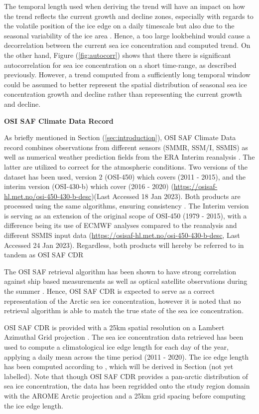 \documentclass[../main/thesis.tex]{subfiles}
\begin{document}
The temporal length used when deriving the trend will have an impact on how the trend reflects the current growth and decline zones, especially with regards to the volatile position of the ice edge on a daily timescale but also due to the seasonal variability of the ice area \citep{Holland2016}. Hence, a too large lookbehind would cause a decorrelation between the current sea ice concentration and computed trend. On the other hand, Figure (\ref{fig:autocorr}) shows that there there is significant autocorrelation for sea ice concentration on a short time-range, as described previously. However, a trend computed from a sufficiently long temporal window could be assumed to better represent the spatial distribution of seasonal sea ice concentration growth and decline rather than representing the current growth and decline.

\textbf{OSI SAF Climate Data Record}

As briefly mentioned in Section (\ref{sec:introduction}), OSI SAF Climate Data record combines observations from different sensors (SMMR, SSM/I, SSMIS) as well as numerical weather prediction fields from the ERA Interim reanalysis \citep{Dee2011}. The latter are utilized to correct for the atmospheric conditions. Two versions of the dataset has been used, version 2 (OSI-450) which covers (2011 - 2015), and the interim version (OSI-430-b) which cover (2016 - 2020) (\url{https://osisaf-hl.met.no/osi-450-430-b-desc})(Last Accessed 18 Jan 2023). Both products are processed using the same algorithms, ensuring consistency \citep{Lavergne2019a}. The Interim version is serving as an extension of the original scope of OSI-450 (1979 - 2015), with a difference being its use of ECMWF analyses compared to the reanalysis and different SSMIS input data (\url{https://osisaf-hl.met.no/osi-450-430-b-desc}, Last Accessed 24 Jan 2023). Regardless, both products will hereby be referred to in tandem as OSI SAF CDR

The OSI SAF retrieval algorithm has been shown to have strong correlation against ship based measurements \citep{Kern2019} as well as optical satellite observations during the summer \citep{Kern2020}. Hence, OSI SAF CDR is expected to serve as a correct representation of the Arctic sea ice concentration, however it is noted that no retrieval algorithm is able to match the true state of the sea ice concentration.

OSI SAF CDR is provided with a 25km spatial resolution on a Lambert Azimuthal Grid projection \citep{Soerensen2021}. The sea ice concentration data retrieved has been used to compute a climatological ice edge length for each day of the year, applying a daily mean across the time period (2011 - 2020). The ice edge length has been computed according to \citet{Melsom2019}, which will be derived in Section (not yet labelled). Note that though OSI SAF CDR provides a pan-arctic distribution of sea ice concentration, the data has been regridded onto the study region domain with the  AROME Arctic projection and a 25km grid spacing before computing the ice edge length.
\end{document}
